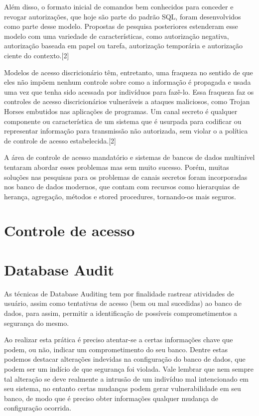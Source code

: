 \documentclass{article}
\begin{document}
Além disso, o formato inicial de comandos bem conhecidos para conceder e revogar autorizações, que hoje são parte do padrão SQL, foram desenvolvidos como parte desse modelo. Propostas de pesquisa posteriores estenderam esse modelo com uma variedade de características, como autorização negativa, autorização baseada em papel ou tarefa, autorização temporária e autorização ciente do contexto.[2]

Modelos de acesso discricionário têm, entretanto, uma fraqueza no sentido de que eles não impõem nenhum controle sobre como a informação é propagada e usada uma vez que tenha sido acessada por indivíduos para fazê-lo. Essa fraqueza faz os controles de acesso discricionários vulneráveis a ataques maliciosos, como Trojan Horses embutidos nas aplicações de programas. Um canal secreto é qualquer componente ou característica de um sistema que é usurpada para codificar ou representar informação para transmissão não autorizada, sem violar o a política de controle de acesso estabelecida.[2]

A área de controle de acesso mandatório e sistemas de bancos de dados multinível tentaram abordar esses problemas mas sem muito sucesso. Porém, muitas soluções nas pesquisas para os problemas de canais secretos foram incorporadas nos banco de dados modernos, que contam com recursos como hierarquias de herança, agregação, métodos e stored procedures, tornando-os mais seguros.

\section{Controle de acesso}

\section{Database Audit}

As técnicas de Database Auditing tem por finalidade rastrear atividades de usuário, assim como tentativas de acesso (bem ou mal sucedidas) ao banco de dados, para assim, permitir a identificação de possíveis comprometimentos a segurança do mesmo.

Ao realizar esta prática é preciso atentar-se a certas informações chave que podem, ou não, indicar um comprometimento do seu banco. Dentre estas podemos destacar alterações indevidas na configuração do banco de dados, que podem ser um indício de que segurança foi violada. Vale lembrar que nem sempre tal alteração se deve realmente a intrusão de um indivíduo mal intencionado em seu sistema, no entanto certas mudanças podem gerar vulnerabilidade em seu banco, de modo que é preciso obter informações qualquer mudança de configuração ocorrida.
\end{document}
